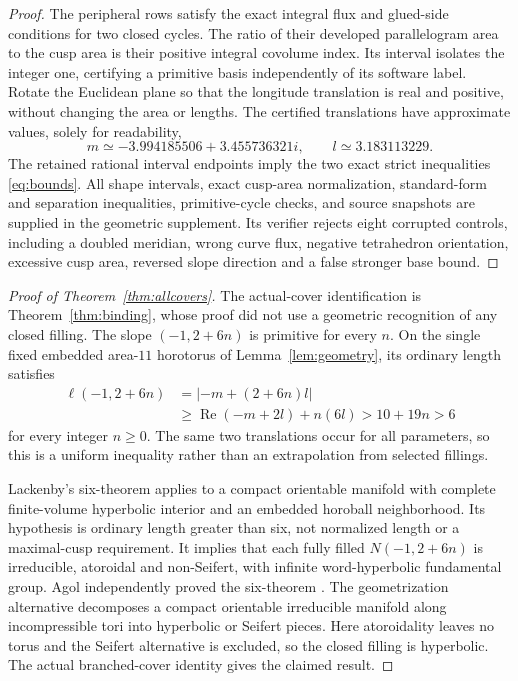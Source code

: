 \documentclass[11pt]{article}
\begin{document}
\begin{proof}
The peripheral rows satisfy the exact integral flux and glued-side
conditions for two closed cycles. The ratio of their developed
parallelogram area to the cusp area is their positive integral
covolume index. Its interval isolates the integer one, certifying a
primitive basis independently of its software label. Rotate the
Euclidean plane so that the longitude translation is real and
positive, without changing the area or lengths. The certified
translations have approximate values, solely for readability,
\[
             m\simeq-3.994185506+3.455736321i,\qquad
             l\simeq3.183113229.
\]
The retained rational interval endpoints imply the two exact strict
inequalities \eqref{eq:bounds}.
All shape intervals, exact cusp-area normalization, standard-form
and separation inequalities, primitive-cycle checks, and source
snapshots are supplied in the geometric supplement. Its verifier
rejects eight corrupted controls, including a doubled meridian,
wrong curve flux, negative tetrahedron orientation, excessive cusp
area, reversed slope direction and a false stronger base bound.
\end{proof}

\begin{proof}[Proof of Theorem~\ref{thm:allcovers}]
The actual-cover identification is Theorem~\ref{thm:binding}, whose
proof did not use a geometric recognition of any closed filling.
The slope $(-1,2+6n)$ is primitive for every $n$. On the single fixed
embedded area-$11$ horotorus of Lemma~\ref{lem:geometry}, its ordinary
length satisfies
\begin{align*}
 \ell(-1,2+6n)
   &=|-m+(2+6n)l|\\
   &\ge\operatorname{Re}(-m+2l)+n(6l)
     >10+19n>6
\end{align*}
for every integer $n\ge0$. The same two translations occur for all
parameters, so this is a uniform inequality rather than an
extrapolation from selected fillings.

Lackenby's six-theorem \cite[Theorem~3.1, printed p.~12]{lackenby}
applies to a compact orientable manifold with complete finite-volume
hyperbolic interior and an embedded horoball neighborhood. Its
hypothesis is ordinary length greater than six, not normalized length
or a maximal-cusp requirement. It implies that each fully filled
$N(-1,2+6n)$ is irreducible, atoroidal and non-Seifert, with infinite
word-hyperbolic fundamental group. Agol independently proved the
six-theorem \cite[Theorem~6.2, p.~440]{agol}.
The geometrization alternative
\cite[Theorem~1.7.6, printed p.~19]{afw} decomposes a compact orientable
irreducible manifold along incompressible tori into hyperbolic or
Seifert pieces. Here atoroidality leaves no torus and the Seifert
alternative is excluded, so the closed filling is hyperbolic.
The actual branched-cover identity gives the claimed result.
\end{proof}
\end{document}
